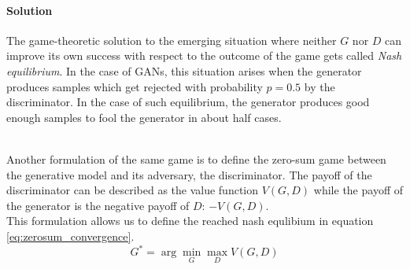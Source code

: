 \paragraph{Solution}
The game-theoretic solution to the emerging situation where neither $G$ nor $D$ can improve its own success with respect to the outcome of the game gets called \emph{Nash equilibrium}\cite{game_theory:1994}.
In the case of GANs, this situation arises when the generator produces samples which get rejected with probability $p=0.5$ by the discriminator. In the case of such equilibrium, the generator produces good enough samples to fool the generator in about half cases.\\\\



Another formulation of the same game is to define the zero-sum game between the generative model and its adversary, the discriminator.
The payoff of the discriminator can be described as the value function $V(G,D)$ while the payoff of the generator is the negative payoff of $D$: $-V(G,D)$.\\
This formulation allows us to define the reached nash equlibium in equation \ref{eq:zerosum_convergence}.
\begin{equation}
  \label{eq:zerosum_convergence}
  G^* = \arg \min_{G} \max_{D} V(G,D)
\end{equation}









